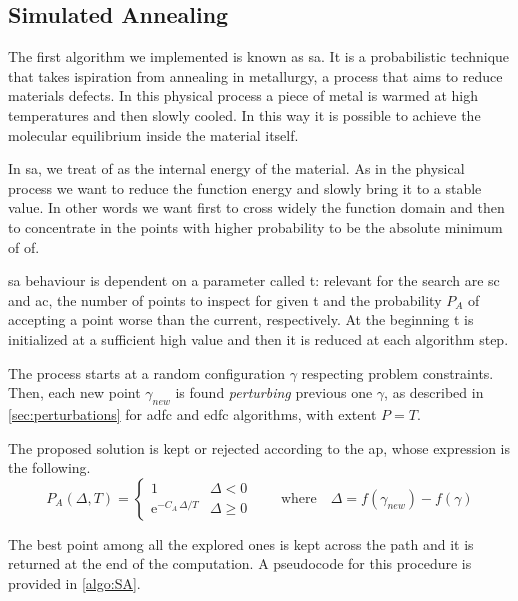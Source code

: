 \documentclass[12pt,journal,draftclsnofoot,onecolumn]{IEEEtran}
\begin{document}
\subsection{Simulated Annealing}
The first algorithm we implemented is known as \gls{sa}.
It is a probabilistic technique that takes ispiration from annealing in metallurgy, a process that aims to reduce materials defects.
In this physical process a piece of metal is warmed at high temperatures and then slowly cooled. In this way it is possible to achieve the molecular equilibrium inside the material itself.

In \gls{sa}, we treat \gls{of} as the internal energy of the material.
As in the physical process we want to reduce the function energy and slowly bring it to a stable value. In other words we want first to cross widely the function domain and then to concentrate in the points with higher probability to be the absolute minimum of \gls{of}.

\gls{sa} behaviour is dependent on a parameter called \gls{t}: relevant for the search are \gls{sc} and \gls{ac}, the number of points to inspect for given \gls{t} and the probability $P_A$ of accepting a point worse than the current, respectively. At the beginning \gls{t} is initialized at a sufficient high value and then it is reduced at each algorithm step.

The process starts at a random configuration $\gamma$ respecting problem constraints.
Then, each new point $\gamma_{new}$ is found \emph{perturbing} previous one $\gamma$, as described in \autoref{sec:perturbations} for \gls{adfc} and \gls{edfc} algorithms, with extent $P=T$.

The proposed solution is kept or rejected according to the \gls{ap}, whose expression is the following.
\begin{equation*} \label{accept_prob}
	P_A(\Delta, T) = \begin{cases}
		1 & \Delta < 0 \\
		\mathrm{e}^{ - C_A \, \Delta / T }
		& \Delta \geq 0
	\end{cases}
	\quad \quad \text{where} \quad \Delta = f(\gamma_{new})-f (\gamma)
\end{equation*}

The best point among all the explored ones is kept across the path and it is returned at the end of the computation.
A pseudocode for this procedure is provided in \autoref{algo:SA}.
\end{document}
